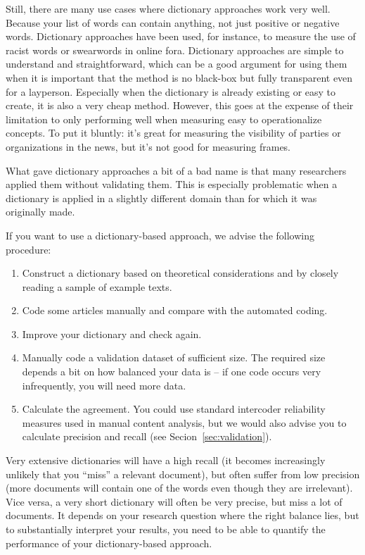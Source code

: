 Still, there are many use cases where dictionary approaches work very
well. Because your list of words can contain anything, not just
positive or negative words. Dictionary approaches have been used, for
instance, to measure the use of racist words or swearwords in online
fora. Dictionary approaches are simple to understand and
straightforward, which can be a good argument for using them when it
is important that the method is no black-box but fully transparent
even for a layperson. Especially when the dictionary is already
existing or easy to create, it is also a very cheap method. However, this goes at the expense of their limitation to only performing well when measuring easy to operationalize concepts. To put it bluntly: it's great for measuring the visibility of parties or organizations in the news, but it's not
good for measuring frames.

What gave dictionary approaches a bit of a bad name is that many
researchers applied them without validating them. This is especially
problematic when a dictionary is applied in a slightly different
domain than for which it was originally made.

If you want to use a dictionary-based approach, we advise the
following procedure:

\begin{enumerate}
  \item Construct a dictionary based on theoretical considerations and by closely reading a sample of example texts.
  \item Code some articles manually and compare with the automated coding.
  \item Improve your dictionary and check again.
  \item Manually code a validation dataset of sufficient size. The required size depends a bit on how balanced your data is -- if one code occurs very infrequently, you will need more data.
  \item Calculate the agreement. You could use standard intercoder reliability measures used in manual content analysis, but we would also advise you to calculate precision and recall (see Secion~\ref{sec:validation}).
  \end{enumerate}

Very extensive dictionaries will have a high recall (it becomes
increasingly unlikely that you ``miss'' a relevant document), but
often suffer from low precision (more documents will contain one of
the words even though they are irrelevant). Vice versa, a very short
dictionary will often be very precise, but miss a lot of documents.
It depends on your research question where the right balance lies, but
to substantially interpret your results, you need to be able to
quantify the performance of your dictionary-based approach.
